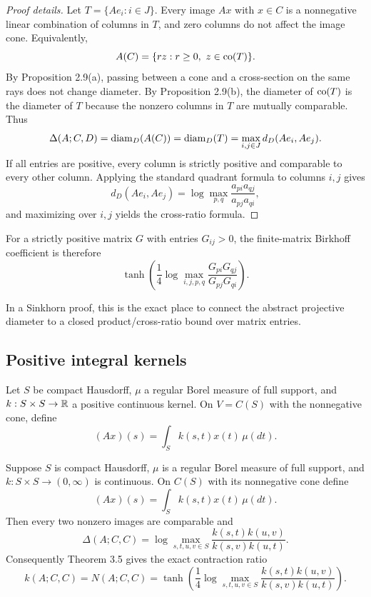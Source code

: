 \begin{proof}[Proof details]
Let $T=\{Ae_i:i\in J\}$.
Every image $Ax$ with $x\in C$ is a nonnegative linear combination of columns in $T$, and zero columns do not affect the image cone.
Equivalently,
\[
  A(C)=\{r z:r\ge0,\ z\in\operatorname{co}(T)\}.
\]
By Proposition 2.9(a), passing between a cone and a cross-section on the same rays does not change diameter.
By Proposition 2.9(b), the diameter of $\operatorname{co}(T)$ is the diameter of $T$ because the nonzero columns in $T$ are mutually comparable.
Thus
\[
  \Delta(A;C,D)=\operatorname{diam}_D(A(C))=\operatorname{diam}_D(T)=\max_{i,j\in J}d_D(Ae_i,Ae_j).
\]
If all entries are positive, every column is strictly positive and comparable to every other column.
Applying the standard quadrant formula to columns $i,j$ gives
\[
  d_D(Ae_i,Ae_j)=\log\max_{p,q}\frac{a_{p i}a_{q j}}{a_{p j}a_{q i}},
\]
and maximizing over $i,j$ yields the cross-ratio formula.
\end{proof}

\begin{commentarynotes}
\item For a strictly positive matrix $G$ with entries $G_{ij}>0$, the finite-matrix Birkhoff coefficient is therefore
\[
  \tanh\!\left(\frac{1}{4}\log\max_{i,j,p,q}\frac{G_{p i}G_{q j}}{G_{p j}G_{q i}}\right).
\]
\item In a Sinkhorn proof, this is the exact place to connect the abstract projective diameter to a closed product/cross-ratio bound over matrix entries.
\end{commentarynotes}

\subsection{Positive integral kernels}
Let $S$ be compact Hausdorff, $\mu$ a regular Borel measure of full support, and $k:S\times S\to\mathbb{R}$ a positive continuous kernel.
On $V=C(S)$ with the nonnegative cone, define
\[
  (Ax)(s)=\int_S k(s,t)x(t)\,\mu(dt).
\]
\begin{theorem}
Suppose $S$ is compact Hausdorff, $\mu$ is a regular Borel measure of full
support, and $k:S\times S\to(0,\infty)$ is continuous.  On $C(S)$ with its
nonnegative cone define
\[
  (Ax)(s)=\int_S k(s,t)x(t)\,\mu(dt).
\]
Then every two nonzero images are comparable and
\[
  \Delta(A;C,C)=
  \log\max_{s,t,u,v\in S}\frac{k(s,t)k(u,v)}{k(s,v)k(u,t)}.
\]
Consequently Theorem 3.5 gives the exact contraction ratio
\[
  k(A;C,C)=N(A;C,C)
  =\tanh\!\left(
     \frac14\log\max_{s,t,u,v\in S}
       \frac{k(s,t)k(u,v)}{k(s,v)k(u,t)}
   \right).
\]
\end{theorem}


